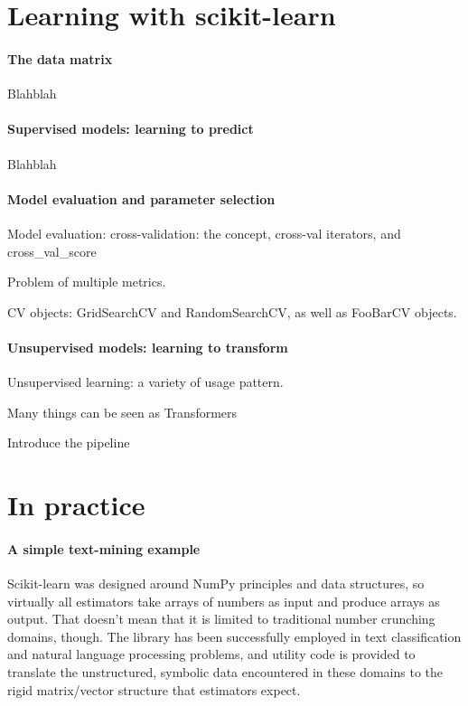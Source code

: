 \documentclass[a4paper]{article}
\begin{document}
\section{Learning with scikit-learn}

\paragraph{The data matrix}
%
Blahblah

\paragraph{Supervised models: learning to predict}
%
Blahblah

\paragraph{Model evaluation and parameter selection}
%
Model evaluation:
cross-validation: the concept, cross-val iterators, and cross\_val\_score

Problem of multiple metrics.

CV objects: GridSearchCV and RandomSearchCV, as well as FooBarCV objects.

\paragraph{Unsupervised models: learning to transform}
%
Unsupervised learning: a variety of usage pattern.

Many things can be seen as Transformers

Introduce the pipeline

\section{In practice}

\paragraph{A simple text-mining example}
%

Scikit-learn was designed around NumPy principles and data structures,
so virtually all estimators take arrays of numbers as input
and produce arrays as output.
That doesn't mean that it is limited to traditional number crunching domains,
though.
The library has been successfully employed in text classification
and natural language processing problems,
and utility code is provided to translate the unstructured, symbolic data
encountered in these domains
to the rigid matrix/vector structure that estimators expect.
\end{document}
